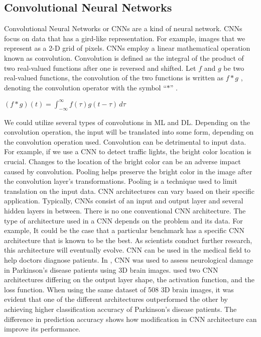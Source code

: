 \documentclass[oneside,12pt,article]{article}
\begin{document}
\subsection{Convolutional Neural Networks}
	Convolutional Neural Networks or CNNs are a kind of neural network. CNNs focus on data that has a gird-like representation. For example, images that we represent as a 2-D grid of pixels. CNNs employ a linear mathematical operation known as convolution. Convolution is defined as the integral of the product of two real-valued functions after one is reversed and shifted. Let $f$ and $g$ be two real-valued functions, the convolution of the two functions is written as $f * g $ , denoting the convolution operator with the symbol “$*$” \cite{al2017review}\cite{kisacanin1994fast}.




\begin{center}
	$(f*g)(t) = \int_{-\infty}^{\infty} f(\tau)g(t - \tau) \,d\tau $  

\end{center}
We could utilize several types of convolutions in ML and DL. Depending on the convolution operation, the input will be translated into some form, depending on the convolution operation used. Convolution can be detrimental to input data. For example, if we use a CNN to detect traffic lights, the bright color location is crucial. Changes to the location of the bright color can be an adverse impact caused by convolution. Pooling helps preserve the bright color in the image after the convolution layer's transformations. Pooling is a technique used to limit translation on the input data. CNN architectures can vary based on their specific application. Typically, CNNs consist of an input and output layer and several hidden layers in between. There is no one conventional CNN architecture. The type of architecture used in a CNN depends on the problem and its data. For example, It could be the case that a particular benchmark has a specific CNN architecture that is known to be the best. As scientists conduct further research, this architecture will eventually evolve\cite{bengio2017deep}. CNN can be used in the medical field to help doctors diagnose patients. In \cite{barbero2021ordinal}, CNN was used to assess neurological damage in Parkinson's disease patients using 3D brain images. \cite{barbero2021ordinal} used two CNN architectures differing on the output layer shape, the activation function, and the loss function. When using the same dataset of 508 3D brain images, it was evident that one of the different architectures outperformed the other by achieving higher classification accuracy of Parkinson's disease patients. The difference in prediction accuracy shows how modification in CNN architecture can improve its performance.  
\end{document}
